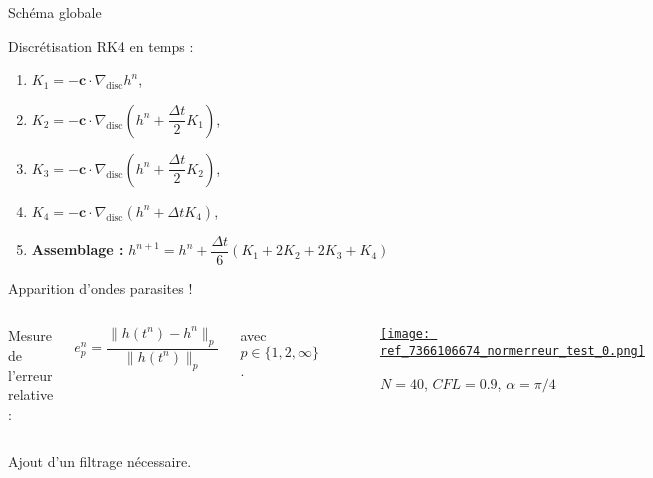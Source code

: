 \documentclass[11pt]{beamer}
\begin{document}
\begin{frame}{Schéma globale}

\begin{block}{Discrétisation RK4 en temps :}

\begin{enumerate}
\item $K_1 = - \mathbf{c} \cdot \nabla_{\text{disc}} h^n$,

\item $K_2 = - \mathbf{c} \cdot \nabla_{\text{disc}} \left(h^n + \dfrac{\Delta t}{2} K_1\right)$,

\item $K_3 = - \mathbf{c} \cdot \nabla_{\text{disc}} \left(h^n + \dfrac{\Delta t}{2} K_2\right)$,

\item $K_4 = - \mathbf{c} \cdot \nabla_{\text{disc}} \left(h^n + \Delta t K_4\right)$,

\item \textbf{Assemblage :} $h^{n+1} = h^n + \dfrac{\Delta t}{6} \left( K_1 + 2 K_2 + 2 K_3 + K_4  \right)$
\end{enumerate}

\end{block}
\end{frame}

\begin{frame}

\begin{alertblock}{}
Apparition d'ondes parasites !
\end{alertblock}

\begin{columns}
Mesure de l'erreur relative :

$$e_p^n = \dfrac{\| h(t^n) - h^n \|_p}{\|h(t^n)\|_p}$$

avec $p \in \lbrace 1, 2, \infty \rbrace$.

\begin{center}
\begin{figure}
\href{run:ref_7363895058_test_0.avi}{\texttt{[image: ref\_7366106674\_normerreur\_test\_0.png]}} 
\caption{$N=40$, $CFL=0.9$, $\alpha = \pi /4$}
\end{figure}
\end{center}
\end{columns}

\pause
\begin{block}{}
Ajout d'un filtrage nécessaire.
\end{block}
\end{frame}
\end{document}
